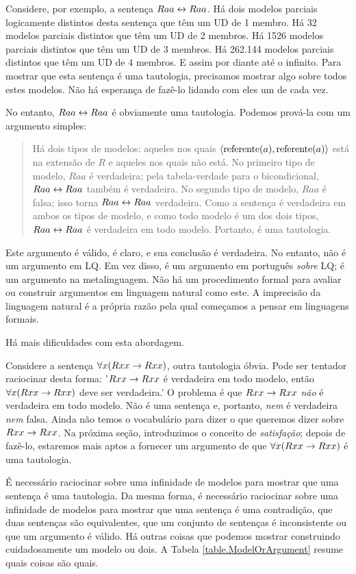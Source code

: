 Considere, por exemplo, a sentença $Raa\leftrightarrow Raa$. Há dois modelos parciais logicamente distintos desta sentença que têm um UD de 1 membro. Há 32 modelos parciais distintos que têm um UD de 2 membros. Há 1526 modelos parciais distintos que têm um UD de 3 membros. Há 262.144 modelos parciais distintos que têm um UD de 4 membros. E assim por diante até o infinito. Para mostrar que esta sentença é uma tautologia, precisamos mostrar algo sobre todos estes modelos. Não há esperança de fazê-lo lidando com eles um de cada vez.

No entanto, $Raa\leftrightarrow Raa$ é obviamente uma tautologia. Podemos prová-la com um argumento simples:
\begin{quote}
\label{allmodels1}
Há dois tipos de modelos: aqueles nos quais ${\langle}\mbox{referente}(a),\mbox{referente}(a){\rangle}$ está na extensão de $R$ e aqueles nos quais não está. No primeiro tipo de modelo, $Raa$ é verdadeira; pela tabela-verdade para o bicondicional, $Raa\leftrightarrow Raa$ também é verdadeira. No segundo tipo de modelo, $Raa$ é falsa; isso torna $Raa\leftrightarrow Raa$ verdadeira. Como a sentença é verdadeira em ambos os tipos de modelo, e como todo modelo é um dos dois tipos, $Raa\leftrightarrow Raa$ é verdadeira em todo modelo. Portanto, é uma tautologia.
\end{quote}
Este argumento é válido, é claro, e sua conclusão é verdadeira. No entanto, não é um argumento em LQ. Em vez disso, é um argumento em português \emph{sobre} LQ; é um argumento na metalinguagem. Não há um procedimento formal para avaliar ou construir argumentos em linguagem natural como este. A imprecisão da linguagem natural é a própria razão pela qual começamos a pensar em linguagens formais.

Há mais dificuldades com esta abordagem.

Considere a sentença $\forall x(Rxx\rightarrow Rxx)$, outra tautologia óbvia. Pode ser tentador raciocinar desta forma: '$Rxx\rightarrow Rxx$ é verdadeira em todo modelo, então $\forall x(Rxx\rightarrow Rxx)$ deve ser verdadeira.' O problema é que $Rxx\rightarrow Rxx$ \emph{não} é verdadeira em todo modelo. Não é uma sentença e, portanto, \emph{nem} é verdadeira \emph{nem} falsa. Ainda não temos o vocabulário para dizer o que queremos dizer sobre $Rxx\rightarrow Rxx$. Na próxima seção, introduzimos o conceito de \emph{satisfação}; depois de fazê-lo, estaremos mais aptos a fornecer um argumento de que $\forall x(Rxx\rightarrow Rxx)$ é uma tautologia.

É necessário raciocinar sobre uma infinidade de modelos para mostrar que uma sentença é uma tautologia. Da mesma forma, é necessário raciocinar sobre uma infinidade de modelos para mostrar que uma sentença é uma contradição, que duas sentenças são equivalentes, que um conjunto de sentenças é inconsistente ou que um argumento é válido. Há outras coisas que podemos mostrar construindo cuidadosamente um modelo ou dois. A Tabela \ref{table.ModelOrArgument} resume quais coisas são quais.

